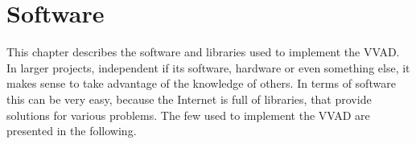 \chapter{Software}
\label{cha:software}
This chapter describes the software and libraries used to implement the VVAD.
In larger projects, independent if its software, hardware or even something else, it makes sense to
take advantage of the knowledge of others.
In terms of software this can be very easy, because the Internet is full of libraries, that provide solutions for various problems.
The few used to implement the VVAD are presented in the following.

